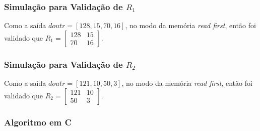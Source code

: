 \documentclass{beamer}
\begin{document}
    \begin{frame}
        \frametitle{Simulação para Validação de $ R_1 $}

        \begingroup {}
            Como a saída $ doutr = [128, 15, 70, 16] $, 
            no modo da memória \textit{read first}, então
            foi validado que $ R_1 = \begin{bmatrix} 128 & 15 \\ 70 & 16 \end{bmatrix} $.
        \endgroup

        \begin{figure}[h] 
            \centering
          \end{figure}
    \end{frame}

    \begin{frame}
        \frametitle{Simulação para Validação de $ R_2 $}

        \begingroup {}
            Como a saída $ doutr = [121, 10, 50, 3] $, 
            no modo da memória \textit{read first}, então
            foi validado que $ R_2 = \begin{bmatrix} 121 & 10 \\ 50 & 3 \end{bmatrix} $.
        \endgroup

        \begin{figure}[h] 
            \centering
          \end{figure}
    \end{frame}

    \begin{frame}[fragile]
        \frametitle{Algoritmo em C}

    \end{frame}
\end{document}
